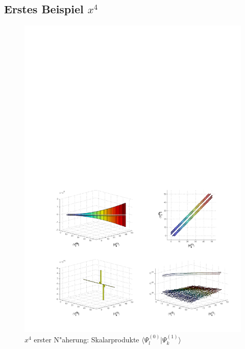 \begin{refsection}
\subsection{Erstes Beispiel $x^4$}

\begin{figure}	%
\centering
\includegraphics[width=1.0\textwidth]{anharmonisch/images/x4/Stoerung1Skalare.pdf}
\caption{$x^4$ erster N"aherung: Skalarprodukte $\langle\Psi_l^{(0)}|\Psi_k^{(1)}\rangle$
\label{skript:x4_Stoerung1Skalare}}
\end{figure}


\end{refsection}
